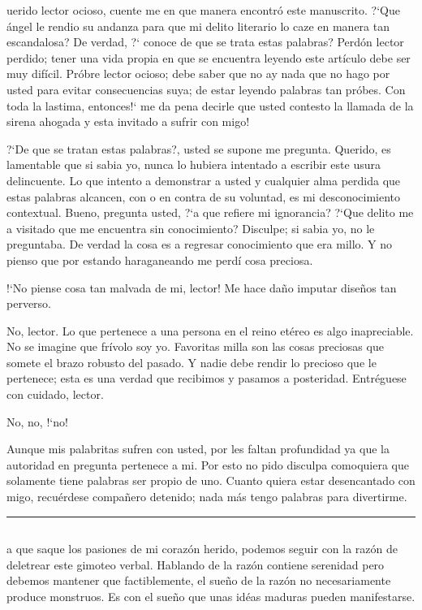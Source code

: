 \documentclass[12pt]{article}
\begin{document}
	\begin{multicols*}{2}
		uerido lector ocioso, cuente me en que manera encontr\'{o} este manuscrito. \mbox{?`}Que \'{a}ngel le rendio su andanza para que mi delito literario lo caze en manera tan escandalosa? De verdad, \mbox{?`} conoce de que se trata estas palabras? Perd\'{o}n lector perdido; tener una vida propia en que se encuentra leyendo este art\'{i}culo debe ser muy difícil. Pr\'{o}bre lector ocioso; debe saber que no ay nada que no hago por usted para evitar consecuencias suya; de estar leyendo palabras tan pr\'{o}bes. Con toda la lastima, entonces\mbox{!`} me da pena decirle que usted contesto la llamada de la sirena ahogada y esta invitado a sufrir con migo!
		
		\mbox{?`}De que se tratan estas palabras?, usted se supone me pregunta. Querido, es lamentable que si sabia yo, nunca lo hubiera intentado a escribir este usura delincuente. Lo que intento a demonstrar a usted y cualquier alma perdida que estas palabras alcancen, con o en contra de su voluntad, es mi desconocimiento contextual. Bueno, pregunta usted, \mbox{?`}a que refiere mi ignorancia? \mbox{?`}Que delito me a visitado que me encuentra sin conocimiento? Disculpe; si sabia yo, no le preguntaba. De verdad la cosa es a regresar conocimiento que era millo. Y no pienso que por estando haraganeando me perd\'{i} cosa preciosa.
		
		\mbox{!`}No piense cosa tan malvada de mi, lector! Me hace da\~{n}o imputar dise\~{n}os tan perverso.
		
		No, lector. Lo que pertenece a una persona en el reino etéreo es algo inapreciable. No se imagine que fr\'{i}volo soy yo. Favoritas milla son las cosas preciosas que somete el brazo robusto del pasado. Y nadie debe rendir lo precioso que le pertenece; esta es una verdad que recibimos y pasamos a posteridad. Entr\'{e}guese con cuidado, lector.
		
		No, no, \mbox{!`}no!
		
		Aunque mis palabritas sufren con usted, por les faltan profundidad ya que la autoridad en pregunta pertenece a mi.  Por esto no pido disculpa comoquiera que solamente tiene palabras ser propio de uno. Cuanto quiera estar desencantado con migo, recu\'{e}rdese compa\~{n}ero detenido; nada m\'{a}s tengo palabras para divertirme.
		
		\noindent\rule{\columnsep}{1pt}
		
		\subsection{}
		a que saque los pasiones de mi coraz\'{o}n herido, podemos seguir con la raz\'{o}n de deletrear este gimoteo verbal. Hablando de la raz\'{o}n contiene serenidad pero debemos mantener que factiblemente, el sue\~{n}o de la raz\'{o}n no necesariamente produce monstruos. Es con el sue\~{n}o que unas id\'{e}as maduras pueden manifestarse.
		

\end{multicols*}
\end{document}

